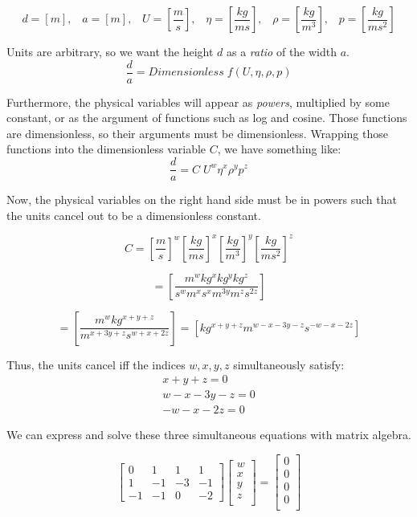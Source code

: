 \documentclass[]{article}
\begin{document}
\[ d = [m],\;\;\; a = [m],\;\;\; U = \left[\frac{m}{s} \right],\;\;\;
 \eta = \left[\frac{kg}{ms} \right],\;\;\; \rho = \left[\frac{kg}{m^{3}} \right]
 ,\;\;\; p = \left[ \frac{kg}{m s^{2}} \right] \]

Units are arbitrary, so we want the height $d$ as a \emph{ratio} of the width $a$.
\[ \frac{d}{a} = Dimensionless \; f(U, \eta, \rho, p) \]

Furthermore, the physical variables will appear as \emph{powers}, multiplied by some constant, or as the argument of functions such as log and cosine.  Those functions are dimensionless, so their arguments must be dimensionless.  Wrapping those functions into the dimensionless variable $C$, we have something like:
\[ \frac{d}{a} = C \; U^{w} \eta^{x} \rho^{y} p^{z} \]

Now, the physical variables on the right hand side must be in powers such that the units cancel out to be a dimensionless constant.

\[ C = \left[ \frac{m}{s} \right]^{w} \left[ \frac{kg}{ms} \right]^{x}
\left[ \frac{kg}{m^{3}} \right]^{y} \left[ \frac{kg}{m s^{2}} \right]^{z} \]

\[ = \left[ \frac{m^{w} kg^{x} kg^{y} kg^{z}}{s^{w} m^{x} s^{x} m^{3y} m^{z} s^{2z}} \right] \]

\[ = \left[ \frac{m^{w} kg^{x+y+z}}{m^{x+3y+z} s^{w+x+2z}} \right] = 
\left[ kg^{x+y+z} m^{w-x-3y-z} s^{-w-x-2z} \right] \]

Thus, the units cancel iff the indices $w,x,y,z$ simultaneously satisfy:
\[ 
\begin{matrix}
x+y+z = 0 \\ w-x-3y-z = 0 \\ -w-x-2z = 0 
\end{matrix}
\]

We can express and solve these three simultaneous equations with matrix algebra.

\[ \begin{bmatrix}
0  &  1 & 1  &  1 \\
1  & -1 & -3 & -1 \\
-1 & -1 & 0  & -2
\end{bmatrix}
\begin{bmatrix}
w \\ x \\ y \\ z \\
\end{bmatrix}
=
\begin{bmatrix}
0 \\ 0 \\ 0 \\ 0 \\
\end{bmatrix}
\]
\end{document}
